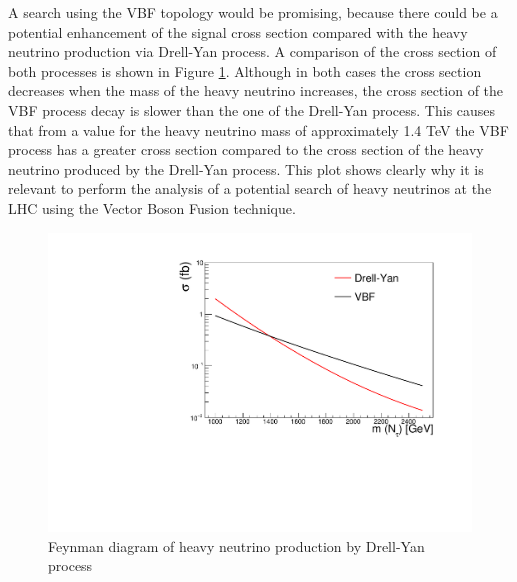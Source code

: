 A search using the VBF topology would be promising, because there could be a potential enhancement of the signal cross section compared with the heavy neutrino production via Drell-Yan process. A comparison of the cross section of both processes is shown in Figure \ref{fig: DY vs VBF}. Although in both cases the cross section decreases when the mass of the heavy neutrino increases, the cross section of the VBF process decay is slower than the one of the Drell-Yan process. This causes that from a value for the heavy neutrino mass of approximately 1.4 TeV the VBF process has a greater cross section compared to the cross section of the heavy neutrino produced by the Drell-Yan process. This plot shows clearly why it is relevant to perform the analysis of a potential search of heavy neutrinos at the LHC using the Vector Boson Fusion technique.

\begin{figure}
\centering
\includegraphics[width=\linewidth]{DY_vs_VBF_HN}
\caption{Feynman diagram of heavy neutrino production by Drell-Yan process}
\label{fig: DY vs VBF}
\end{figure}


